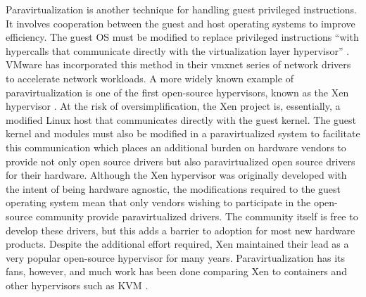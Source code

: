 Paravirtualization is another technique for handling guest privileged instructions.
It involves cooperation between the guest and host operating systems to improve efficiency.
The guest OS must be modified to replace privileged instructions ``with hypercalls that communicate directly with the virtualization layer hypervisor'' \autocite{vmwareVT}.
VMware has incorporated this method in their vmxnet series of network drivers to accelerate network workloads.
A more widely known example of paravirtualization is one of the first open-source hypervisors, known as the Xen hypervisor \autocite{_barham_1}.
At the risk of oversimplification, the Xen project is, essentially, a modified Linux host that communicates directly with the guest kernel.
The guest kernel and modules must also be modified in a paravirtualized system to facilitate this communication which places an additional burden on hardware vendors to provide not only open source drivers but also paravirtualized open source drivers for their hardware.
Although the Xen hypervisor was originally developed with the intent of being hardware agnostic, the modifications required to the guest operating system mean that only vendors wishing to participate in the open-source community provide paravirtualized drivers.
The community itself is free to develop these drivers, but this adds a barrier to adoption for most new hardware products.
Despite the additional effort required, Xen maintained their lead as a very popular open-source hypervisor for many years.
Paravirtualization has its fans, however, and much work has been done comparing Xen to containers and other hypervisors such as KVM \autocite{_felter_1, _younge_1, wangAmazon2010, _che_1, _scheepers_1, wangAllocation2007, rathore2013kvm}.

